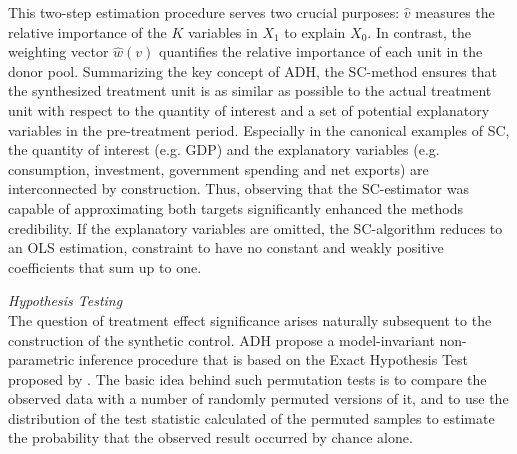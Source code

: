 This two-step estimation procedure serves two crucial purposes: $\widehat{v}$ measures the relative importance of the $K$ variables in $X_1$ to explain $X_0$. In contrast, the weighting vector $\widehat{w}(v)$ quantifies the relative importance of each unit in the donor pool. Summarizing the key concept of \ac{ADH}, the \ac{SC}-method ensures that the synthesized treatment unit is as similar as possible to the actual treatment unit with respect to the quantity of interest and a set of potential explanatory variables in the pre-treatment period. Especially in the canonical examples of \ac{SC}, the quantity of interest (e.g. \ac{GDP}) and the explanatory variables (e.g. consumption, investment, government spending and net exports) are interconnected by construction. Thus, observing that the \ac{SC}-estimator was capable of approximating both targets significantly enhanced the methods credibility. If the explanatory variables are omitted, the \ac{SC}-algorithm reduces to an \ac{OLS} estimation, constraint to have no constant and weakly positive coefficients that sum up to one.

\textit{Hypothesis Testing} \\
The question of treatment effect significance arises naturally subsequent to the construction of the synthetic control. \ac{ADH} propose a model-invariant non-parametric inference procedure that is based on the Exact Hypothesis Test proposed by \cite{fisher:1971}. The basic idea behind such permutation tests is to compare the observed data with a number of randomly permuted versions of it, and to use the distribution of the test statistic calculated of the permuted samples to estimate the probability that the observed result occurred by chance alone. 

